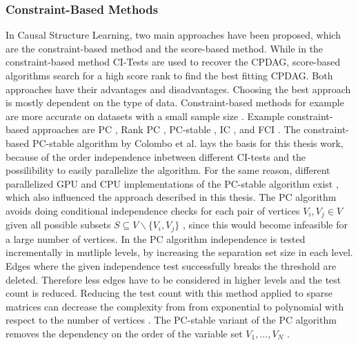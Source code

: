 \subsubsection{Constraint-Based Methods}
In Causal Structure Learning, two main approaches have been proposed, which are the constraint-based method and the score-based method. While in the constraint-based method CI-Tests are used to recover the CPDAG, score-based algorithms search for a high score rank to find the best fitting CPDAG. Both approaches have their advantages and disadvantages. Choosing the best approach is mostly dependent on the type of data. Constraint-based methods for example are more accurate on datasets with a small sample size \cite{scutariBayesianNetworkConstraintBased2017}. Example constraint-based approaches are PC \cite{spirtesCausationPredictionSearch1993}, Rank PC \cite{harrisPCAlgorithmNonparanormal}, PC-stable \cite{colomboOrderIndependentConstraintBasedCausal}, IC \cite{vermaEquivalenceSynthesisCausal1990}, and FCI \cite{spirtesCausationPredictionSearch1993}.
The constraint-based PC-stable algorithm by Colombo et al. \cite{colomboOrderIndependentConstraintBasedCausal} lays the basis for this thesis work, because of the order independence inbetween different CI-tests and the possilibility to easily parallelize the algorithm. For the same reason, different parallelized GPU and CPU implementations of the PC-stable algorithm exist \cite{schmidtLoadBalancedParallelConstraintBased2019,schmidtOrderIndependentConstraintBasedCausal2018,zarebavaniCuPCCUDAbasedParallel2018}, which also influenced the approach described in this thesis.
The PC algorithm avoids doing conditional independence checks for each pair of vertices $V_i, V_j \in V$ given all possible subsets $S \subseteq V \backslash \{V_i, V_j\}$ \cite{pearlTheoryInferredCausation1995}, since this would become infeasible for a large number of vertices. In the PC algorithm independence is tested incrementally in mutliple levels, by increasing the separation set size in each level. Edges where the given independence test successfully breaks the threshold are deleted. Therefore less edges have to be considered in higher levels and the test count is reduced. Reducing the test count with this method applied to sparse matrices can decrease the complexity from from exponential to polynomial with respect to the number of vertices \cite{kalischEstimatingHighDimensionalDirected2007}.
The PC-stable variant of the PC algorithm removes the dependency on the order of the variable set $V_1, ...,V_N$ \cite{colomboOrderIndependentConstraintBasedCausal,schmidtOrderIndependentConstraintBasedCausal2018}.

